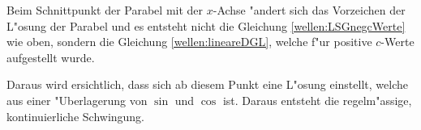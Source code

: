 \begin{refsection}
Beim Schnittpunkt der Parabel mit der $x$-Achse "andert sich das Vorzeichen der 
L"osung der Parabel und es entsteht nicht die Gleichung 
\ref{wellen:LSGnegcWerte} wie oben, sondern die Gleichung 
\ref{wellen:lineareDGL}, welche f"ur positive $c$-Werte aufgestellt wurde. 

Daraus wird ersichtlich, dass sich ab diesem Punkt eine L"osung einstellt, 
welche aus einer "Uberlagerung von $\sin$ und $\cos$ ist. Daraus entsteht die 
regelm"assige, kontinuierliche Schwingung. 








\printbibliography[heading=subbibliography]
\end{refsection}